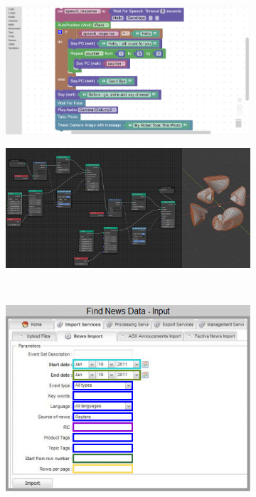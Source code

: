\begin{figure}
\centering
\begin{subfigure}[b]{0.45\linewidth}
  \graphicspath{{../../assets/images/background/vpl/}}
  \centering
  \includegraphics[width=\linewidth]{block-based.png}
  \caption{}\label{fig:vpl-types:1}
\end{subfigure}%
\qquad %
\begin{subfigure}[b]{0.45\linewidth}
  \graphicspath{{../../assets/images/background/vpl/}}
  \centering
  \includegraphics[width=\linewidth]{diagram-based.jpg}
  \caption{}\label{fig:vpl-types:2}
\end{subfigure}%
\\
\begin{subfigure}[c]{0.45\linewidth}
  \centering
  \graphicspath{{../../assets/images/background/vpl/}}
  \includegraphics[width=\linewidth]{form-based.png}

\end{subfigure}
\end{figure}
